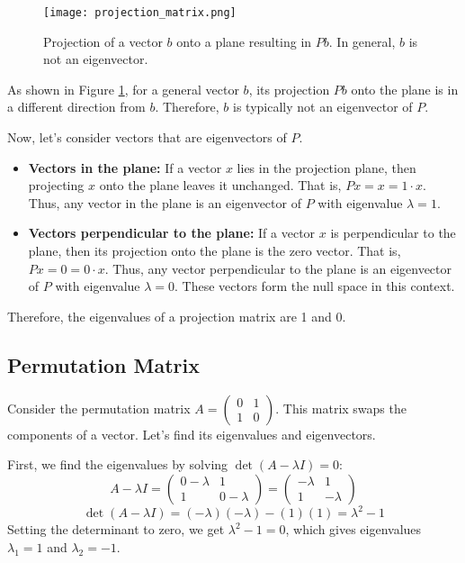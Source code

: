 \documentclass{article}
\begin{document}
\begin{figure}[h]
    \centering
    \texttt{[image: projection\_matrix.png]}
    \caption{Projection of a vector $b$ onto a plane resulting in $Pb$. In general, $b$ is not an eigenvector.}
    \label{fig:projection_matrix}
\end{figure}


As shown in Figure \ref{fig:projection_matrix}, for a general vector $b$, its projection $Pb$ onto the plane is in a different direction from $b$. Therefore, $b$ is typically not an eigenvector of $P$.

Now, let's consider vectors that are eigenvectors of $P$.
\begin{itemize}
    \item \textbf{Vectors in the plane:} If a vector $x$ lies in the projection plane, then projecting $x$ onto the plane leaves it unchanged. That is, $Px = x = 1 \cdot x$.  Thus, any vector in the plane is an eigenvector of $P$ with eigenvalue $\lambda = 1$.
    \item \textbf{Vectors perpendicular to the plane:} If a vector $x$ is perpendicular to the plane, then its projection onto the plane is the zero vector. That is, $Px = 0 = 0 \cdot x$. Thus, any vector perpendicular to the plane is an eigenvector of $P$ with eigenvalue $\lambda = 0$. These vectors form the null space in this context.
\end{itemize}
Therefore, the eigenvalues of a projection matrix are 1 and 0.

\subsection{Permutation Matrix}
Consider the permutation matrix $A = \begin{pmatrix} 0 & 1 \\ 1 & 0 \end{pmatrix}$. This matrix swaps the components of a vector. Let's find its eigenvalues and eigenvectors.

First, we find the eigenvalues by solving $\det(A - \lambda I) = 0$:
\[A - \lambda I = \begin{pmatrix} 0-\lambda & 1 \\ 1 & 0-\lambda \end{pmatrix} = \begin{pmatrix} -\lambda & 1 \\ 1 & -\lambda \end{pmatrix}\]
\[\det(A - \lambda I) = (-\lambda)(-\lambda) - (1)(1) = \lambda^2 - 1\]
Setting the determinant to zero, we get $\lambda^2 - 1 = 0$, which gives eigenvalues $\lambda_1 = 1$ and $\lambda_2 = -1$.
\end{document}
